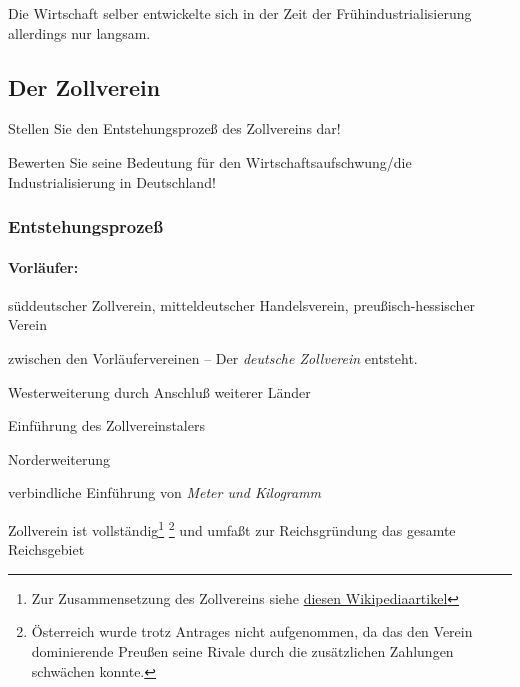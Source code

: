 Die Wirtschaft selber entwickelte sich in der Zeit der
Frühindustrialisierung allerdings nur langsam.


\subsection{Der Zollverein}
\label{ssc:zollv}

\begin{aufgabe}
Stellen Sie den Entstehungsprozeß des Zollvereins dar!

Bewerten Sie seine Bedeutung für den Wirtschaftsaufschwung/die
Industrialisierung in Deutschland!
\end{aufgabe}

\subsubsection{Entstehungsprozeß}

\paragraph{Vorläufer:} süddeutscher Zollverein, mitteldeutscher
Handelsverein, preußisch-hessischer Verein

\begin{chronik}
\item[1.\,1.\,1834]
 zwischen den Vorläufervereinen -- Der
\emph{deutsche Zollverein} entsteht.

\item[bis 1854]
Westerweiterung durch Anschluß weiterer Länder

\item[1857]
Einführung des Zollvereinstalers

\item[1867]
Norderweiterung

\item[1868]
verbindliche Einführung von \emph{Meter und Kilogramm}

\item[1871]
Zollverein ist vollständig\footnote{Zur Zusammensetzung des
Zollvereins siehe
\href{http://de.wikipedia.org/wiki/Gebiet_des_Deutschen_Zollvereins}
{diesen Wikipediaartikel}}
\footnote{Österreich wurde trotz Antrages nicht aufgenommen, da das
den Verein dominierende Preußen seine Rivale durch die zusätzlichen
Zahlungen schwächen konnte.}
und umfaßt zur Reichsgründung das gesamte Reichsgebiet
\end{chronik}


